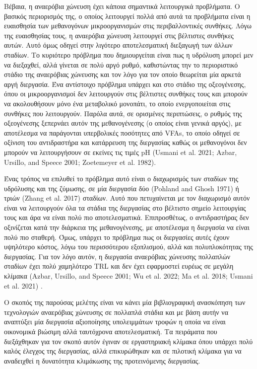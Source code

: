 \documentclass[11pt]{article}
\begin{document}
Βέβαια, η αναερόβια χώνευση έχει κάποια σημαντικά λειτουργικά προβλήματα. Ο βασικός περιορισμός της, ο οποίος λειτουργεί πολλά από αυτά τα προβλήματα είναι η ευαισθησία των μεθανογόνων μικροοργανισμών στις περιβαλλοντικές συνθήκες. Λόγω της ευαισθησίας τους, η αναερόβια χώνευση λειτουργεί στις βέλτιστες συνθήκες αυτών. Αυτό όμως οδηγεί στην λιγότερο αποτελεσματική διεξαγωγή των άλλων σταδίων. Το κυριότερο πρόβλημα που δημιουργείται είναι πως η υδρόλυση μπορεί μεν να διεξαχθεί, αλλά γίνεται σε πολύ αργό ρυθμό, καθιστώντας την το περιοριστικό στάδιο της αναερόβιας χώνευσης και τον λόγο για τον οποίο θεωρείται μία αρκετά αργή διεργασία. Ένα αντίστοιχο πρόβλημα υπάρχει και στο στάδιο της οξεογένεσης, όπου οι μικροοργανισμοί δεν λειτουργούν στις βέλτιστες συνθήκες τους και μπορούν να ακολουθήσουν μόνο ένα μεταβολικό μονοπάτι, το οποίο ενεργοποιείται στις συνθήκες που λειτουργούν. Παρόλα αυτά, σε ορισμένες περιπτώσεις, ο ρυθμός της οξεογένεσης ξεπερνάει αυτόν της μεθανογένεσης (ο οποίος είναι γενικά αργός), με αποτέλεσμα να παράγονται υπερβολικές ποσότητες από VFAs, το οποίο οδηγεί σε οξίνιση του αντιδραστήρα και κατάρρευση της διεργασίας καθώς οι μεθανογόνοι δεν μπορούν να λειτουργήσουν σε εκείνες τις τιμές pH (Usmani et al. 2021; Azbar, Ursillo, and Speece 2001; Zoetemeyer et al. 1982).

Ένας τρόπος να επιλυθεί το πρόβλημα αυτό είναι ο διαχωρισμός των σταδίων της υδρόλυσης και της ζύμωσης, σε μία διεργασία δύο (Pohland and Ghosh 1971) ή τριών (Zhang et al. 2017) σταδίων. Αυτό που πετυχαίνεται με τον διαχωρισμό αυτόν είναι να λειτουργούν όλα τα στάδια της διεργασίας στο βέλτιστο σημείο λειτουργίας τους και άρα να είναι πολύ πιο αποτελεσματικά. Επιπροσθέτως, ο αντιδραστήρας δεν οξινίζεται κατά την διάρκεια της μεθανογένεσης, με αποτέλεσμα η διεργασία να είναι πολύ πιο σταθερή. Όμως, υπάρχει το πρόβλημα πως οι διεργασίες αυτές έχουν υψηλότερο κόστος, λόγω του περισσότερου εξοπλισμού, αλλά και πολυπλοκότητας της διεργασίας. Για τον λόγο αυτόν, η διεργασία αναερόβιας χώνευσης πολλαπλών σταδίων έχει πολύ χαμηλότερο TRL και δεν έχει εφαρμοστεί ευρέως σε μεγάλη κλίμακα (Azbar, Ursillo, and Speece 2001; Wu et al. 2022; Ma et al. 2018; Usmani et al. 2021) . 

Ο σκοπός της παρούσας μελέτης είναι να κάνει μία βιβλιογραφική ανασκόπηση των τεχνολογιών αναερόβιας χώνευσης σε πολλαπλά στάδια και με βάση αυτήν να αναπτύξει μία διεργασία αξιοποίησης υπολειμμάτων τροφών η οποία να είναι οικονομικά βιώσιμη αλλά ταυτόχρονα αποτελεσματική. Τα πειράματα που διεξάχθηκαν για τον σκοπό αυτόν έγιναν σε εργαστηριακή κλίμακα όπου υπάρχει πολύ καλός έλεγχος της διεργασίας, αλλά επικυρώθηκαν και σε πιλοτική κλίμακα για να αναδειχθεί η δυνατότητα κλιμάκωσης της προτεινόμενης διεργασίας.
\end{document}
